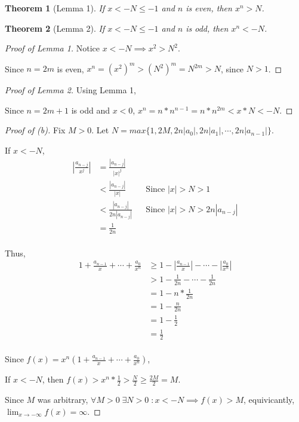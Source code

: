 \documentclass{article} %
\theoremstyle{plain}
\newtheorem*{theorem*}{Theorem}
\theoremstyle{definition}
\begin{document}
\begin{theorem*}[Lemma 1] If $x < -N \leq -1$ and $n$ is even, then $x^n > N$.
\end{theorem*}
\begin{theorem*}[Lemma 2] If $x < -N \leq -1$ and $n$ is odd, then $x^n < -N$.
\end{theorem*}

\begin{proof}[Proof of Lemma 1]
    Notice $x < -N \implies x^2 > N^2$.

    Since $n = 2m$ is even, $x^n = (x^2)^m > (N^2)^m = N^{2m} > N$, since $N > 1$.
\end{proof}
\begin{proof}[Proof of Lemma 2]
    Using Lemma 1,

    Since $n = 2m + 1$ is odd and $x < 0$, $x^n = n * n^{n-1} = n * n^{2m} < x * N < -N$.
\end{proof}

\begin{proof}[Proof of (b)] 
    Fix $M > 0$. Let $N = max\{1, 2M, 2n|a_0|, 2n|a_1|, \cdots, 2n|a_{n-1}| \}$. 

    If $x < -N$,
    \begin{align*}
        | \frac{a_{n-j}}{x^j} | & = \frac{|a_{n-j}|}{|x|^j} & & \\
        & < \frac{|a_{n-j}|}{|x|} & & \text{Since $|x| > N > 1$} \\
        & < \frac{|a_{n-j}|}{2n|a_{n-j}|} & & \text{Since $|x| > N > 2n|a_{n-j}|$} \\
        & = \frac{1}{2n} & & \\
    \end{align*}

    Thus,
    \begin{align*}
        1 + \frac{a_{n-1}}{x} + \cdots + \frac{a_0}{x^n} & \geq 1 - |\frac{a_{n-1}}{x}| - \cdots - |\frac{a_0}{x^n}| \\
        & > 1 - \frac{1}{2n} - \cdots - \frac{1}{2n} \\
        & = 1 - n * \frac{1}{2n} \\
        & = 1 - \frac{n}{2n} \\
        & = 1 - \frac{1}{2} \\
        & = \frac{1}{2} \\
    \end{align*}

    Since $f(x) = x^n(1 + \frac{a_{n-1}}{x} + \cdots + \frac{a_0}{x^n})$,

    If $x < -N$, then $f(x) > x^n * \frac{1}{2} > \frac{N}{2} \geq \frac{2M}{2} = M$.

    Since $M$ was arbitrary, $\forall M > 0 \; \exists N > 0 \; \colon x < -N \implies f(x) > M$, equivicantly, $\lim_{x \to -\infty} f(x) = \infty$.
\end{proof} 
\end{document}
